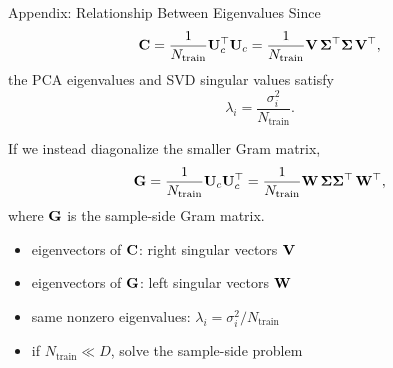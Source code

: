 \documentclass[10pt,aspectratio=169]{ntuabeamer}
\begin{document}
\begin{frame}{Appendix: Relationship Between Eigenvalues}
  \small
  Since
  \[
    \mathbf{C} = \frac{1}{N_{\mathrm{train}}}\mathbf{U}_c^{\top}\mathbf{U}_c
    = \frac{1}{N_{\mathrm{train}}}\mathbf{V}\,\mathbf{\Sigma}^{\top}\mathbf{\Sigma}\,\mathbf{V}^{\top},
  \]
  the PCA eigenvalues and SVD singular values satisfy
  \[
    \lambda_i = \frac{\sigma_i^2}{N_{\mathrm{train}}}.
  \]

  If we instead diagonalize the smaller Gram matrix,
  \[
    \mathbf{G} = \frac{1}{N_{\mathrm{train}}}\mathbf{U}_c\mathbf{U}_c^{\top}
    = \frac{1}{N_{\mathrm{train}}}\mathbf{W}\,\mathbf{\Sigma}\mathbf{\Sigma}^{\top}\,\mathbf{W}^{\top},
  \]
  where \(\mathbf{G}\) is the sample-side Gram matrix.
  \begin{itemize}
    \item eigenvectors of \(\mathbf{C}\): right singular vectors \(\mathbf{V}\)
    \item eigenvectors of \(\mathbf{G}\): left singular vectors \(\mathbf{W}\)
    \item same nonzero eigenvalues: \(\lambda_i = \sigma_i^2/N_{\mathrm{train}}\)
    \item if \(N_{\mathrm{train}} \ll D\), solve the sample-side problem
  \end{itemize}
\end{frame}
\end{document}
